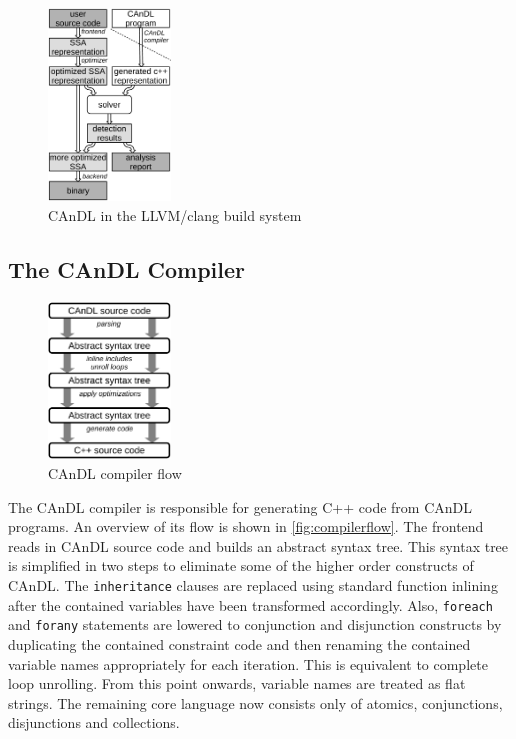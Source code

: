 \begin{figure}[ht]
\centering
\includegraphics[width=0.29\textwidth]{figures/compilerFlow2.pdf}
\caption{CAnDL in the LLVM/clang build system}
\label{fig:build2}
\end{figure}

\subsection{The CAnDL Compiler}

\begin{figure}[t]
\centering
\includegraphics[width=0.29\textwidth]{figures/candlstages.pdf}
\caption{CAnDL compiler flow}
\label{fig:compilerflow}
\end{figure}

    The CAnDL compiler is responsible for generating C++ code from CAnDL
    programs.
    An overview of its  flow is shown in \autoref{fig:compilerflow}.
    The frontend reads in  CAnDL source code and builds an abstract syntax tree.
    This syntax tree is simplified in two steps to eliminate some of the higher
    order constructs of CAnDL.
    The \texttt{inheritance} clauses are replaced using standard function
    inlining after the contained variables have been transformed accordingly.
    Also, \texttt{foreach} and \texttt{forany} statements are lowered to
    conjunction and disjunction constructs by duplicating the contained
    constraint code and then renaming the contained variable names appropriately
    for each iteration.
    This is equivalent to complete loop unrolling.
    From this point onwards, variable names are treated as flat strings.
    The remaining core language now consists only of atomics, conjunctions,
    disjunctions and collections.

